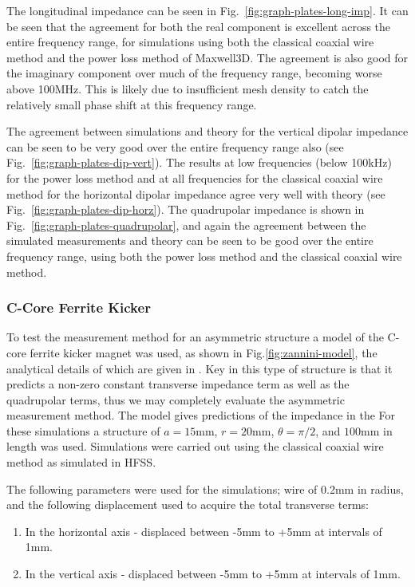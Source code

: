 The longitudinal impedance can be seen in Fig.~\ref{fig:graph-plates-long-imp}. It can be seen that the agreement for both the real component is excellent across the entire frequency range, for simulations using both the classical coaxial wire method and the power loss method of Maxwell3D. The agreement is also good for the imaginary component over much of the frequency range, becoming worse above 100MHz. This is likely due to insufficient mesh density to catch the relatively small phase shift at this frequency range.

The agreement between simulations and theory for the vertical dipolar impedance can be seen to be very good over the entire frequency range also (see Fig.~\ref{fig:graph-plates-dip-vert}). The results at low frequencies (below 100kHz) for the power loss method and at all frequencies for the classical coaxial wire method for the horizontal dipolar impedance agree very well with theory (see Fig.~\ref{fig:graph-plates-dip-horz}). The quadrupolar impedance is shown in Fig.~\ref{fig:graph-plates-quadrupolar}, and again the agreement between the simulated measurements and theory can be seen to be good over the entire frequency range, using both the power loss method and the classical coaxial wire method.

\subsubsection{C-Core Ferrite Kicker}

To test the measurement method for an asymmetric structure a model of the C-core ferrite kicker magnet was used, as shown in Fig.\ref{fig:zannini-model}, the analytical details of which are given in \cite{Zannini:cCoreFerrite}. Key in this type of structure is that it predicts a non-zero constant transverse impedance term as well as the quadrupolar terms, thus we may completely evaluate the asymmetric measurement method. The model gives predictions of the impedance in the  For these simulations a structure of $a=15$mm, $r=20$mm, $\theta = \pi / 2$, and $100$mm in length was used. Simulations were carried out using the classical coaxial wire method as simulated in HFSS.

The following parameters were used for the simulations; wire of 0.2mm in radius, and the following displacement used to acquire the total transverse terms:

\begin{enumerate}
\item{In the horizontal axis -  displaced between -5mm to +5mm at intervals of 1mm.}
\item{In the vertical axis - displaced between -5mm to +5mm at intervals of 1mm.}
\end{enumerate}


